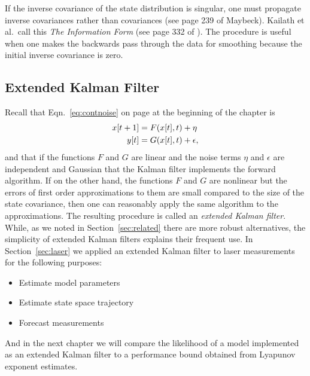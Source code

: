  If the inverse covariance of the state distribution is singular, one
 must propagate inverse covariances rather than covariances (see page
 239 of Maybeck\cite{Maybeck79}).  Kailath et al.\ call this \emph{The
   Information Form} (see page 332 of \cite{KSH00}).
  The procedure is useful when one makes the
 backwards pass through the data for smoothing because the initial
 inverse covariance is zero.

\subsection{Extended Kalman Filter}
\label{sec:EKF}

Recall that Eqn.~\eqref{eq:contnoise} on page \pageref{eq:contnoise}
at the beginning of the chapter is
\begin{align*}
  {x}{[t+1]} &= F({x}{[t]},t) + \eta\\
  {y}{[t]}   &= G({x}{[t]},t) + \epsilon,
\end{align*}
and that if the functions $F$ and $G$ are linear and the noise terms
$\eta$ and $\epsilon$ are independent and Gaussian
that the Kalman filter implements the forward algorithm.  If on the
other hand, the functions $F$ and $G$ are nonlinear but the errors of
first order approximations to them are small compared to the size of
the state covariance, then one can reasonably apply the same algorithm to the
approximations.  The resulting procedure is called an \emph{extended
  Kalman filter}.  While, as we noted in Section~\ref{sec:related}
there are more robust alternatives, the simplicity of extended Kalman
filters explains their frequent use.  In Section~\ref{sec:laser} we
applied an extended Kalman filter to laser measurements for the
following purposes:
\begin{itemize}
\item Estimate model parameters
\item Estimate state space trajectory
\item Forecast measurements
\end{itemize}
And in the next chapter we will compare the likelihood of a model
implemented as an extended Kalman filter to a performance bound
obtained from Lyapunov exponent estimates.

